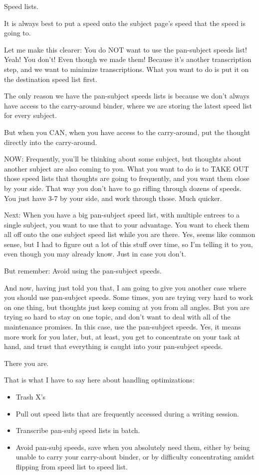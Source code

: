 \documentclass[oneside]{book}
\begin{document}
Speed lists.

It is always best to put a speed onto the subject page's speed that
the speed is going to.

Let me make this clearer: You do NOT want to use the pan-subject
speeds list! Yeah! You don't! Even though we made them! Because it's
another transcription step, and we want to minimize
transcriptions. What you want to do is put it on the destination speed
list first.

The only reason we have the pan-subject speeds lists is because we
don't always have access to the carry-around binder, where we are
storing the latest speed list for every subject.

But when you CAN, when you have access to the carry-around, put the
thought directly into the carry-around.

NOW: Frequently, you'll be thinking about some subject, but thoughts
about another subject are also coming to you. What you want to do is
to TAKE OUT those speed lists that thoughts are going to frequently,
and you want them close by your side. That way you don't have to go
rifling through dozens of speeds. You just have 3-7 by your side, and
work through those. Much quicker.

Next: When you have a big pan-subject speed list, with multiple
entrees to a single subject, you want to use that to your
advantage. You want to check them all off onto the one subject speed
list while you are there. Yes, seems like common sense, but I had to
figure out a lot of this stuff over time, so I'm telling it to you,
even though you may already know. Just in case you don't.

But remember: Avoid using the pan-subject speeds.

And now, having just told you that, I am going to give you another
case where you should use pan-subject speeds. Some times, you are
trying very hard to work on one thing, but thoughts just keep coming
at you from all angles. But you are trying so hard to stay on one
topic, and don't want to deal with all of the maintenance promises. In
this case, use the pan-subject speeds. Yes, it means more work for you
later, but, at least, you get to concentrate on your task at hand, and
trust that everything is caught into your pan-subject speeds.

There you are.

That is what I have to say here about handling optimizations:

\begin{itemize}
\item Trash X's
\item Pull out speed lists that are frequently accessed during a writing
session.
\item Transcribe pan-subj speed lists in batch.
\item Avoid pan-subj speeds, save when you absolutely need them, either by
being unable to carry your carry-about binder, or by difficulty
concentrating amidst flipping from speed list to speed list.
\end{itemize}
\end{document}
